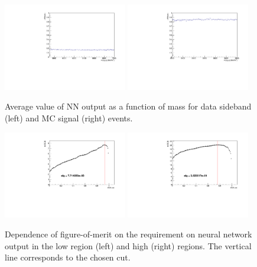\begin{figure}
\centering
\includegraphics[width=0.48\textwidth]{Lmumu/figs/NNout_profile_vs_LbMM_bkgData.pdf}
\includegraphics[width=0.48\textwidth]{Lmumu/figs/NNout_profile_vs_LbMM_MCsignal.pdf}
\caption{Average value of NN output as a function of \Lb mass for data sideband (left) and MC signal (right) events.}
\label{fig:Lb_NNprofiles}
\end{figure}

\begin{figure}
\centering
\includegraphics[width=0.48\textwidth]{Lmumu/figs/significance_Lmumu_lowQ2.pdf}
\includegraphics[width=0.48\textwidth]{Lmumu/figs/significance_Lmumu_highQ2.pdf}
\caption{Dependence of figure-of-merit on the requirement on neural network output in the low \qsq
region (left) and high \qsq (right) regions. The vertical line corresponds to the chosen cut.}
\label{fig:Lb_FOM}
\end{figure}

